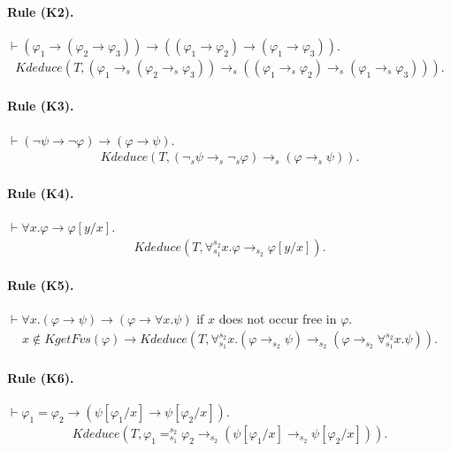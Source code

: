 \documentclass[UTF8,11pt]{article}
\theoremstyle{plain}
\theoremstyle{definition}
\theoremstyle{remark}
\newcommand{\kimplies}{\to}
\newcommand{\knot}{\neg}
\newcommand{\kforall}{\forall}
\newcommand{\kequals}{=}
\newcommand{\KgetFvs}{\mathit{KgetFvs}}
\newcommand{\Kdeduce}{\mathit{Kdeduce}}
\begin{document}
\paragraph{Rule (K2).}
$\vdash (\varphi_1 \to (\varphi_2 \to \varphi_3)) \to ((\varphi_1 \to \varphi_2) \to (\varphi_1 \to \varphi_3))$.
\begin{align*}
\Kdeduce(T, (\varphi_1 \kimplies_s (\varphi_2 \kimplies_s \varphi_3)) 
\kimplies_s ((\varphi_1 \kimplies_s \varphi_2) \kimplies_s (\varphi_1 
\kimplies_s \varphi_3))).
\end{align*}

\paragraph{Rule (K3).}
$\vdash (\neg \psi \to \neg \varphi) \to (\varphi \to \psi)$.
\begin{align*}
\Kdeduce(T, (\knot_s \psi \kimplies_s \knot_s \varphi) \kimplies_s (\varphi 
\kimplies_s \psi)).
\end{align*}

\paragraph{Rule (K4).}
$\vdash \forall x . \varphi \to \varphi[y/x]$.
\begin{align*}
\Kdeduce(T, \kforall_{s_1}^{s_2}  x . \varphi \kimplies_{s_2} \varphi[y/x]).
\end{align*}

\paragraph{Rule (K5).}
$\vdash \forall x . (\varphi \to \psi) \to (\varphi \to \forall x . \psi)$ if $x$ does not occur free in $\varphi$. 
\begin{align*}
x \not\in \KgetFvs(\varphi)
\to \Kdeduce(T, \kforall_{s_1}^{s_2} x . (\varphi \kimplies_{s_2} \psi) 
\kimplies_{s_2} (\varphi \kimplies_{s_2} \kforall_{s_1}^{s_2} x . \psi)).
\end{align*}

\paragraph{Rule (K6).}
$\vdash \varphi_1 = \varphi_2 \to (\psi[\varphi_1/x] \to \psi[\varphi_2/x])$.
\begin{align*}
\Kdeduce(T, \varphi_1 \kequals_{s_1}^{s_2} \varphi_2 \kimplies_{s_2} 
(\psi[\varphi_1/x] \kimplies_{s_2} \psi[\varphi_2/x])).
\end{align*}
\end{document}
